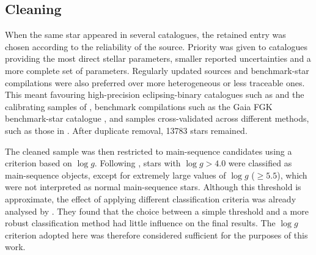 \subsection{Cleaning} \label{sec:cleaning}
When the same star appeared in several catalogues, the retained entry was chosen according to the reliability of the source. Priority was given to catalogues providing the most direct stellar parameters, smaller reported uncertainties and a more complete set of parameters. Regularly updated sources and benchmark-star compilations were also preferred over more heterogeneous or less traceable ones. This meant favouring high-precision eclipsing-binary catalogues such as \citet{Eker2018} and the calibrating samples of \citet{Graczyk2022}, benchmark compilations such as the Gaia FGK benchmark-star catalogue \citep{Soubiran2024}, and samples cross-validated across different methods, such as those in \citet{Serenelli2021}. After duplicate removal, 13783 stars remained.

The cleaned sample was then restricted to main-sequence candidates using a criterion based on $\log g$. Following \citet{bilir2008}, stars with $\log g > 4.0$ were classified as main-sequence objects, except for extremely large values of $\log g$ ($\geq 5.5$), which were not interpreted as normal main-sequence stars. Although this threshold is approximate, the effect of applying different classification criteria was already analysed by \citet{moya2018}. They found that the choice between a simple threshold and a more robust classification method had little influence on the final results. The $\log g$ criterion adopted here was therefore considered sufficient for the purposes of this work.

